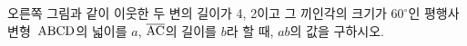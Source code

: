 \noindent\begin{minipage}[t]{0.58\linewidth}\vspace{0pt}\raggedright 오른쪽 그림과 같이 이웃한 두 변의 길이가 4, 2이고 그 끼인각의 크기가 $60^\circ$인 평행사변형~$\mathrm{ABCD}$의 넓이를 $a$, $\overline{\mathrm{AC}}$의 길이를 $b$라 할 때, $ab$의 값을 구하시오.\end{minipage}\hfill\begin{minipage}[t]{0.4\linewidth}\vspace{0pt}\centering \resizebox{\ifdim\width>\linewidth\linewidth\else\width\fi}{!}{}\end{minipage}\par
